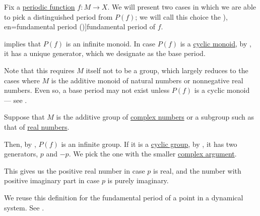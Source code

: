 \begin{definition}\label{def:fundamental_function_period}\mimprovised
  Fix a \hyperref[def:periodic_function]{periodic function} \( f: M \to X \). We will present two cases in which we are able to pick a distinguished period from \( P(f) \); we will call this choice the \term[ru=основной период (\cite[102]{Маркушевич1967АналитическиеФункцииТом1}), en=fundamental period (\cite[157]{Apostol1976AnalyticNumberTheory})]{fundamental period} of \( f \).

  \begin{thmenum}
      implies that \( P(f) \) is an infinite monoid. In case \( P(f) \) is a \hyperref[def:cyclic_monoid]{cyclic monoid}, by , it has a unique generator, which we designate as the base period.

    Note that this requires \( M \) itself not to be a group, which largely reduces to the cases where \( M \) is the additive monoid of natural numbers or nonnegative real numbers. Even so, a base period may not exist unless \( P(f) \) is a cyclic monoid --- see .

     Suppose that \( M \) is the additive group of \hyperref[def:complex_numbers]{complex numbers} or a subgroup such as that of \hyperref[def:real_numbers]{real numbers}.

    Then, by , \( P(f) \) is an infinite group. If it is a \hyperref[def:cyclic_group]{cyclic group}, by , it has two generators, \( p \) and \( -p \). We pick the one with the smaller \hyperref[def:complex_numbers_trigonometric_form]{complex argument}.

    This gives us the positive real number in case \( p \) is real, and the number with positive imaginary part in case \( p \) is purely imaginary.
  \end{thmenum}
\end{definition}
\begin{comments}
  \item We reuse this definition for the fundamental period of a point in a dynamical system. See .
\end{comments}

